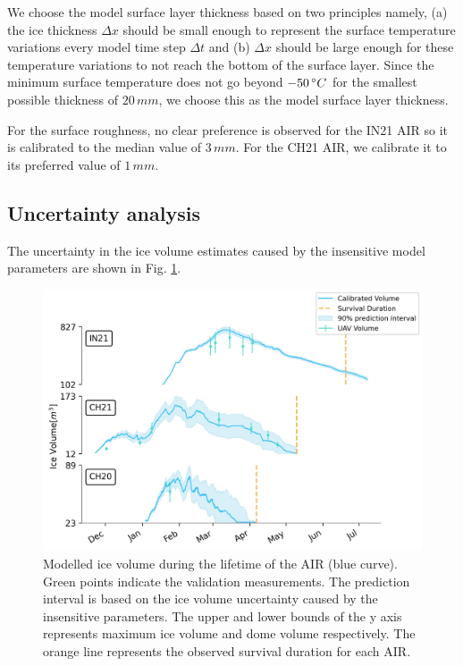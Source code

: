 \documentclass[utf8]{frontiersSCNS} %
\begin{document}
We choose the model surface layer thickness based on two principles namely, (a) the ice thickness $\Delta x$ should
be small enough to represent the surface temperature variations every model time step $\Delta t$ and (b) $\Delta x$
should be large enough for these temperature variations to not reach the bottom of the surface layer. Since the
minimum surface temperature does not go beyond $-50 \, \degree C$ for the smallest possible thickness of $20\, mm$, we
choose this as the model surface layer thickness.

For the surface roughness, no clear preference is observed for the IN21 AIR so it is calibrated to the median
value of $3 \, mm$. For the CH21 AIR, we calibrate it to its preferred value of $1 \, mm$.

\subsection{Uncertainty analysis}
The uncertainty in the ice volume estimates caused by the insensitive model parameters are shown in Fig.
\ref{fig:results}.

\begin{figure}
	\begin{center}
		\includegraphics[width=\linewidth]{Figures/icev_results.jpg}
	\end{center}
	\caption{Modelled ice volume during the lifetime of the AIR (blue curve). Green points indicate the validation
		measurements. The prediction interval is based on the ice volume uncertainty caused by the insensitive
		parameters.  The upper and lower bounds of the y axis represents maximum ice volume and dome volume respectively.
		The orange line represents the observed survival duration for each AIR.
	} \label{fig:results} \end{figure}
\end{document}
